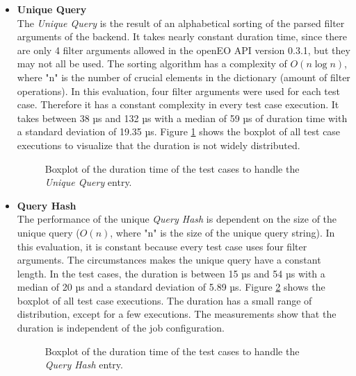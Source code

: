 \documentclass[draft,final]{vutinfth} %
\begin{document}
\begin{itemize}
	\item \textbf{Unique Query} \\
	The \textit{Unique Query} is the result of an alphabetical sorting of the parsed filter arguments of the backend. It takes nearly constant duration time, since there are only 4 filter arguments allowed in the openEO API version 0.3.1, but they may not all be used. The sorting algorithm has a complexity of $O(n\log{}n)$, where "n" is the number of crucial elements in the dictionary (amount of filter operations). In this evaluation, four filter arguments were used for each test case. Therefore it has a constant complexity in every test case execution. It takes between 38 µs and 132 µs with a median of 59 µs of duration time with a standard deviation of 19.35 µs. Figure \ref{fig:evaluation_perf_normalized} shows the boxplot of all test case executions to visualize that the duration is not widely distributed.  
	\begin{figure}[!h]
		\centering
		\caption{Boxplot of the duration time of the test cases to handle the \textit{Unique Query} entry.}
		\label{fig:evaluation_perf_normalized}
	\end{figure}

	\item \textbf{Query Hash} \\
	The performance of the unique \textit{Query Hash} is dependent on the size of the unique query ($O(n)$, where "n" is the size of the unique query string). In this evaluation, it is constant because every test case uses four filter arguments. The circumstances makes the unique query have a constant length. In the test cases, the duration is between 15 µs and 54 µs with a median of 20 µs and a standard deviation of 5.89 µs. Figure \ref{fig:evaluation_perf_norm_hash} shows the boxplot of all test case executions. The duration has a small range of distribution, except for a few executions. The measurements show that the duration is independent of the job configuration. 
	\begin{figure}[!h]
		\centering
		\caption{Boxplot of the duration time of the test cases to handle the \textit{Query Hash} entry.}
		\label{fig:evaluation_perf_norm_hash}
	\end{figure}


\end{itemize}
\end{document}
